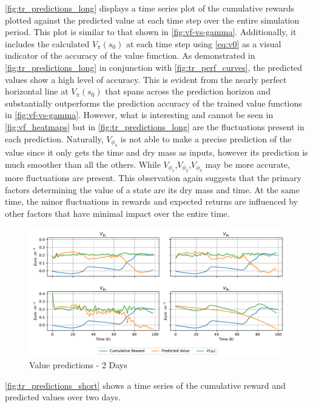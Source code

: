\autoref{fig:tr_predictions_long} displays a time series plot of the cumulative rewards plotted against the predicted value at each time step over the entire simulation period. This plot is similar to that shown in \autoref{fig:vf-vs-gamma}. Additionally, it includes the calculated $V_\pi (s_0)$ at each time step using \autoref{eq:v0} as a visual indicator of the accuracy of the value function. As demonstrated in \autoref{fig:tr_predictions_long} in conjunction with \autoref{fig:tr_perf_curves}, the predicted values show a high level of accuracy. This is evident from the nearly perfect horizontal line at $V_\pi (s_0)$ that spans across the prediction horizon and substantially outperforms the prediction accuracy of the trained value functions in \autoref{fig:vf-vs-gamma}. However, what is interesting and cannot be seen in \autoref{fig:vf_heatmaps} but in \autoref{fig:tr_predictions_long} are the fluctuations present in each prediction. Naturally, $V_{\phi_4}$ is not able to make a precise prediction of the value since it only gets the time and dry mass as inputs, however its prediction is much smoother than all the others. While $V_{\phi_1}$,$V_{\phi_2}$,$V_{\phi_3}$ may be more accurate, more fluctuations are present. This observation again suggests that the primary factors determining the value of a state are its dry mass and time. At the same time, the minor fluctuations in rewards and expected returns are influenced by other factors that have minimal impact over the entire time.



\begin{figure}[H]
	\centering
	\includegraphics[width = \textwidth]{figures/vf_time_predictions_short.pdf}
	\caption{Value predictions - 2 Days}
	\label{fig:tr_predictions_short}
\end{figure}

	


\autoref{fig:tr_predictions_short} shows a time series of the cumulative reward and predicted values over two days.
 


